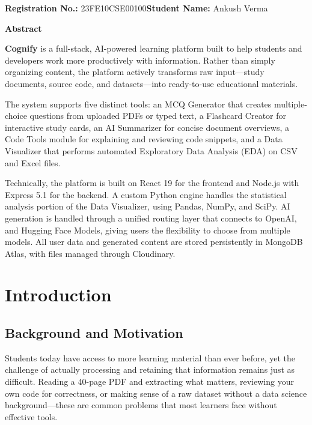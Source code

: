 \documentclass[12pt,a4paper]{article}
\newcommand{\StudentName}{Ankush Verma}
\newcommand{\RegNo}{23FE10CSE00100}
\begin{document}
\vspace{2cm}
\noindent
\textbf{Registration No.:} \RegNo \hfill \textbf{Student Name:} \StudentName
\clearpage

\begin{center}
{\Large \textbf{Abstract}}
\end{center}
\vspace{0.8cm}

\textbf{Cognify} is a full-stack, AI-powered learning platform built to help students and developers work more productively with information. Rather than simply organizing content, the platform actively transforms raw input—study documents, source code, and datasets—into ready-to-use educational materials.

The system supports five distinct tools: an MCQ Generator that creates multiple-choice questions from uploaded PDFs or typed text, a Flashcard Creator for interactive study cards, an AI Summarizer for concise document overviews, a Code Tools module for explaining and reviewing code snippets, and a Data Visualizer that performs automated Exploratory Data Analysis (EDA) on CSV and Excel files.

Technically, the platform is built on React 19 for the frontend and Node.js with Express 5.1 for the backend. A custom Python engine handles the statistical analysis portion of the Data Visualizer, using Pandas, NumPy, and SciPy. AI generation is handled through a unified routing layer that connects to OpenAI, and Hugging Face Models, giving users the flexibility to choose from multiple models. All user data and generated content are stored persistently in MongoDB Atlas, with files managed through Cloudinary.

\clearpage
\tableofcontents
\clearpage

\section{Introduction}

\subsection{Background and Motivation}

Students today have access to more learning material than ever before, yet the challenge of actually processing and retaining that information remains just as difficult. Reading a 40-page PDF and extracting what matters, reviewing your own code for correctness, or making sense of a raw dataset without a data science background—these are common problems that most learners face without effective tools.
\end{document}
